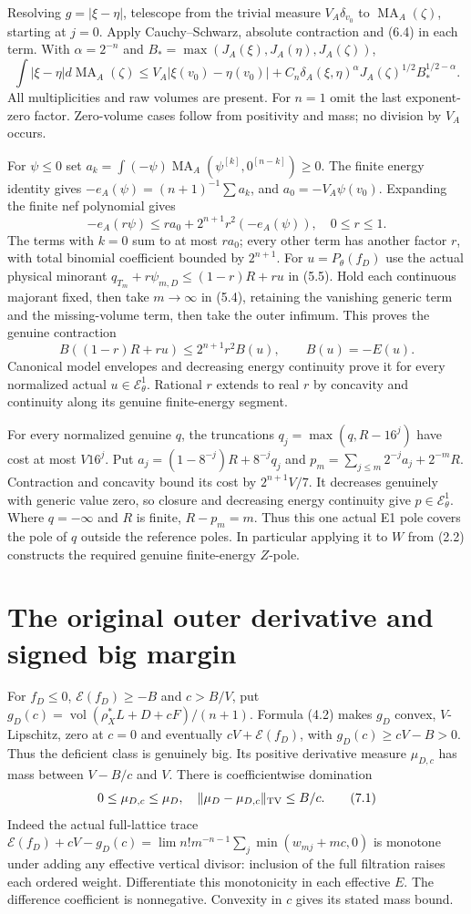 \documentclass[10pt]{article}
\newcommand{\MA}{\operatorname{MA}}
\newcommand{\vol}{\operatorname{vol}}
\newcommand{\EE}{\mathcal E^1_\theta}
\begin{document}
Resolving $g=|\xi-\eta|$, telescope from the trivial measure
$V_A\delta_{v_0}$ to $\MA_A(\zeta)$, starting at $j=0$.
Apply Cauchy--Schwarz, absolute contraction and (6.4) in each term.
With $\alpha=2^{-n}$ and $B_* =\max(J_A(\xi),J_A(\eta),J_A(\zeta))$,
\[
 \int|\xi-\eta|d\MA_A(\zeta)
 \leq V_A|\xi(v_0)-\eta(v_0)|
   +C_n\delta_A(\xi,\eta)^\alpha J_A(\zeta)^{1/2}B_*^{1/2-\alpha}.
 \tag{6.5}
\]
All multiplicities and raw volumes are present. For $n=1$ omit the
last exponent-zero factor. Zero-volume cases follow from positivity and
mass; no division by $V_A$ occurs.

For $\psi\leq0$ set
$a_k=\int(-\psi)\MA_A(\psi^{[k]},0^{[n-k]})\geq0$.
The finite energy identity gives $-e_A(\psi)=(n+1)^{-1}\sum a_k$,
and $a_0=-V_A\psi(v_0)$. Expanding the finite nef polynomial gives
\[
 -e_A(r\psi)\leq r a_0+2^{n+1}r^2(-e_A(\psi)),\quad0\leq r\leq1.
 \tag{6.6}
\]
The terms with $k=0$ sum to at most $ra_0$; every other term has
another factor $r$, with total binomial coefficient bounded by $2^{n+1}$.
For $u=P_\theta(f_D)$ use the actual physical minorant
$q_{T_m}+r\psi_{m,D}\leq(1-r)R+ru$ in (5.5). Hold each continuous
majorant fixed, then take $m\to\infty$ in (5.4), retaining the vanishing
generic term and the missing-volume term, then take the outer infimum.
This proves the genuine contraction
\[
 B((1-r)R+ru)\leq2^{n+1}r^2B(u),\qquad B(u)=-E(u).
 \tag{6.7}
\]
Canonical model envelopes and decreasing energy continuity prove it for
every normalized actual $u\in\EE$. Rational $r$ extends to real $r$
by concavity and continuity along its genuine finite-energy segment.

For every normalized genuine $q$, the truncations
$q_j=\max(q,R-16^j)$ have cost at most $V16^j$.
Put $a_j=(1-8^{-j})R+8^{-j}q_j$ and
$p_m=\sum_{j\leq m}2^{-j}a_j+2^{-m}R$.
Contraction and concavity bound its cost by $2^{n+1}V/7$.
It decreases genuinely with generic value zero, so closure and decreasing
energy continuity give $p\in\EE$. Where $q=-\infty$ and $R$ is finite,
$R-p_m=m$. Thus this one actual E1 pole covers the pole of $q$ outside
the reference poles. In particular applying it to $W$ from (2.2)
constructs the required genuine finite-energy $Z$-pole.

\section{The original outer derivative and signed big margin}
For $f_D\leq0$, $\mathscr E(f_D)\geq-B$ and $c>B/V$, put
$g_D(c)=\vol(\rho_X^*L+D+cF)/(n+1)$.
Formula (4.2) makes $g_D$ convex, $V$-Lipschitz, zero at $c=0$ and
eventually $cV+\mathscr E(f_D)$, with $g_D(c)\geq cV-B>0$.
Thus the deficient class is genuinely big. Its positive derivative
measure $\mu_{D,c}$ has mass between $V-B/c$ and $V$.
There is coefficientwise domination
\[
 0\leq\mu_{D,c}\leq\mu_D,
 \quad\|\mu_D-\mu_{D,c}\|_{\rm TV}\leq B/c.
 \tag{7.1}
\]
Indeed the actual full-lattice trace
$\mathscr E(f_D)+cV-g_D(c)
=\lim n!m^{-n-1}\sum_j\min(w_{mj}+mc,0)$ is monotone under
adding any effective vertical divisor: inclusion of the full filtration
raises each ordered weight. Differentiate this monotonicity in each
effective $E$. The difference coefficient is nonnegative. Convexity
in $c$ gives its stated mass bound.
\end{document}
